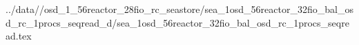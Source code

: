 ../data//osd_1_56reactor_28fio_rc_seastore/sea_1osd_56reactor_32fio_bal_osd_rc_1procs_seqread_d/sea_1osd_56reactor_32fio_bal_osd_rc_1procs_seqread.tex
